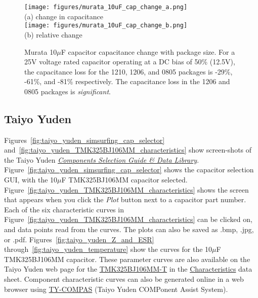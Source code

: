 \documentclass[10pt,twoside]{article}
\begin{document}
%
\begin{figure}[p]
  \begin{center}
    \texttt{[image: figures/murata\_10uF\_cap\_change\_a.png]}\\
    (a) change in capacitance\\
    $\quad$\\
    \texttt{[image: figures/murata\_10uF\_cap\_change\_b.png]}\\
    (b) relative change\\
  \end{center}
  \caption{Murata 10$\mu$F capacitor capacitance change with  package size.
  For a 25V voltage rated capacitor operating at a DC bias of 50\% (12.5V),
  the capacitance loss for the 1210, 1206, and 0805 packages is
  -29\%, -61\%, and -81\%  respectively. The capacitance loss in the
  1206 and 0805 packages is {\em significant}.}
  \label{fig:murata_10uF_cap_change}
\end{figure}

\clearpage
\subsection{Taiyo Yuden}

Figures~\ref{fig:taiyo_yuden_simsurfing_cap_selector} 
and~\ref{fig:taiyo_yuden_TMK325BJ106MM_characteristics} show 
screen-shots of the Taiyo Yuden 
\href{http://www.yuden.co.jp/ut/product/support/tool/}
{\em Components Selection Guide \& Data Library}.
%
Figure~\ref{fig:taiyo_yuden_simsurfing_cap_selector} shows the capacitor
selection GUI, with the 10$\mu$F TMK325BJ106MM capacitor selected.
Figure~\ref{fig:taiyo_yuden_TMK325BJ106MM_characteristics} shows 
the screen that appears when you click the {\em Plot} button
next to a capacitor part number.
%
Each of the six characteristic curves in 
Figure~\ref{fig:taiyo_yuden_TMK325BJ106MM_characteristics}
can be clicked on, and data points read from the curves.
The plots can also be saved as .bmp, .jpg, or .pdf.
Figures~\ref{fig:taiyo_yuden_Z_and_ESR} 
through~\ref{fig:taiyo_yuden_temperature} show the curves
for the 10$\mu$F TMK325BJ106MM capacitor.
%
These parameter curves are also available on the Taiyo Yuden
web page for the
\href{http://www.yuden.co.jp/ut/product/category/capacitor/TMK325BJ106MM-T.html}
{TMK325BJ106MM-T} in the 
\href{http://www.yuden.co.jp/productdata/sheet/tmk325bj106mm.pdf}
{Characteristics} data sheet.
Component characteristic curves can also be generated online in a
web browser using 
\href{http://ds.yuden.co.jp/TYCOMPAS/ut/searcherMain.do}
{TY-COMPAS} (Taiyo Yuden COMPonent Assist System).
\end{document}
